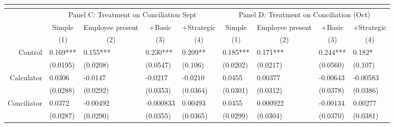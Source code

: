 \begin{tabular}{rrrrrrrrr}
      & \multicolumn{1}{c}{} & \multicolumn{1}{c}{} & \multicolumn{1}{c}{} & \multicolumn{1}{c}{} & \multicolumn{1}{c}{} & \multicolumn{1}{c}{} & \multicolumn{1}{c}{} & \multicolumn{1}{c}{} \\
      \bottomrule
      \toprule
      & \multicolumn{4}{c}{Panel C: Treatment on Conciliation Sept} & \multicolumn{4}{c}{Panel D: Treatment on Conciliation (Oct)} \\
      \midrule
      & \multicolumn{1}{c}{Simple} & \multicolumn{1}{c}{Employee present} & \multicolumn{1}{c}{+Basic} & \multicolumn{1}{c}{+Strategic} & \multicolumn{1}{c}{Simple} & \multicolumn{1}{c}{Employee present} & \multicolumn{1}{c}{+Basic} & \multicolumn{1}{c}{+Strategic} \\
      & \multicolumn{1}{c}{(1)} & \multicolumn{1}{c}{(2)} & \multicolumn{1}{c}{(3)} & \multicolumn{1}{c}{(4)} & \multicolumn{1}{c}{(1)} & \multicolumn{1}{c}{(2)} & \multicolumn{1}{c}{(3)} & \multicolumn{1}{c}{(4)} \\
      \midrule
      \midrule
Control & \multicolumn{1}{l}{0.169***} & \multicolumn{1}{l}{0.155***} & \multicolumn{1}{l}{0.230***} & \multicolumn{1}{l}{0.209**} & \multicolumn{1}{l}{0.185***} & \multicolumn{1}{l}{0.171***} & \multicolumn{1}{l}{0.244***} & \multicolumn{1}{l}{0.182*} \\
      & \multicolumn{1}{l}{(0.0195)} & \multicolumn{1}{l}{(0.0208)} & \multicolumn{1}{l}{(0.0547)} & \multicolumn{1}{l}{(0.106)} & \multicolumn{1}{l}{(0.0202)} & \multicolumn{1}{l}{(0.0217)} & \multicolumn{1}{l}{(0.0560)} & \multicolumn{1}{l}{(0.107)} \\
Calculator & \multicolumn{1}{l}{0.0306} & \multicolumn{1}{l}{-0.0147} & \multicolumn{1}{l}{-0.0217} & \multicolumn{1}{l}{-0.0210} & \multicolumn{1}{l}{0.0455} & \multicolumn{1}{l}{0.00377} & \multicolumn{1}{l}{-0.00643} & \multicolumn{1}{l}{-0.00583} \\
      & \multicolumn{1}{l}{(0.0288)} & \multicolumn{1}{l}{(0.0292)} & \multicolumn{1}{l}{(0.0353)} & \multicolumn{1}{l}{(0.0364)} & \multicolumn{1}{l}{(0.0301)} & \multicolumn{1}{l}{(0.0312)} & \multicolumn{1}{l}{(0.0378)} & \multicolumn{1}{l}{(0.0386)} \\
Conciliator & \multicolumn{1}{l}{0.0372} & \multicolumn{1}{l}{-0.00492} & \multicolumn{1}{l}{-0.000833} & \multicolumn{1}{l}{0.00493} & \multicolumn{1}{l}{0.0455} & \multicolumn{1}{l}{0.000922} & \multicolumn{1}{l}{-0.00134} & \multicolumn{1}{l}{0.00277} \\
      & \multicolumn{1}{l}{(0.0287)} & \multicolumn{1}{l}{(0.0290)} & \multicolumn{1}{l}{(0.0355)} & \multicolumn{1}{l}{(0.0365)} & \multicolumn{1}{l}{(0.0299)} & \multicolumn{1}{l}{(0.0304)} & \multicolumn{1}{l}{(0.0370)} & \multicolumn{1}{l}{(0.0381)} \\

\end{tabular}
